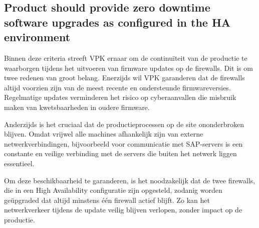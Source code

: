 \subsection{Product should provide zero downtime software upgrades as configured in the HA environment}
Binnen deze criteria streeft VPK ernaar om de continuïteit van de productie te waarborgen tijdens het uitvoeren van firmware updates op de firewalls. Dit is om twee redenen van groot belang.
Enerzijds wil VPK garanderen dat de firewalls altijd voorzien zijn van de meest recente en ondersteunde firmwareversies. Regelmatige updates verminderen het risico op cyberaanvallen die misbruik maken van kwetsbaarheden in oudere firmware.

\vspace{5mm}
Anderzijds is het cruciaal dat de productieprocessen op de site ononderbroken blijven. Omdat vrijwel alle machines afhankelijk zijn van externe netwerkverbindingen, bijvoorbeeld voor communicatie met SAP-servers is een constante en veilige verbinding met de servers die buiten het netwerk liggen essentieel.

\vspace{5mm}
Om deze beschikbaarheid te garanderen, is het noodzakelijk dat de twee firewalls, die in een High Availability configuratie zijn opgesteld, zodanig worden geüpgraded dat altijd minstens één firewall actief blijft. Zo kan het netwerkverkeer tijdens de update veilig blijven verlopen, zonder impact op de productie.

